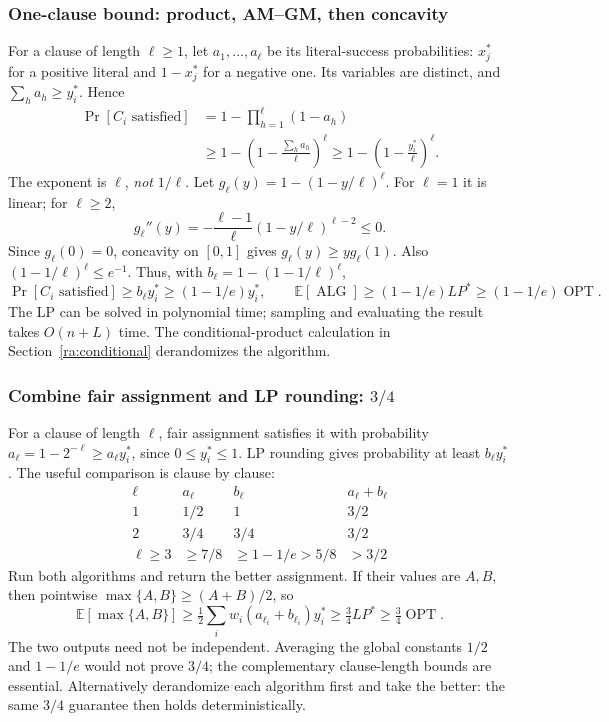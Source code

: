\documentclass[10pt]{article}
\theoremstyle{definition}
\newcommand{\OPT}{\operatorname{OPT}}
\newcommand{\ALG}{\operatorname{ALG}}
\begin{document}
\subsubsection*{One-clause bound: product, AM--GM, then concavity}
For a clause of length $\ell\ge1$, let $a_1,\ldots,a_\ell$ be its
literal-success probabilities: $x_j^*$ for a positive literal and
$1-x_j^*$ for a negative one. Its variables are distinct, and
$\sum_h a_h\ge y_i^*$. Hence
\[
  \begin{aligned}
    \Pr[C_i\text{ satisfied}]
      &=1-\prod_{h=1}^{\ell}(1-a_h)\\
      &\ge1-\left(1-\frac{\sum_h a_h}{\ell}\right)^{\ell}
       \ge1-\left(1-\frac{y_i^*}{\ell}\right)^{\ell}.
  \end{aligned}
\]
The exponent is $\ell$, \emph{not} $1/\ell$.
Let $g_\ell(y)=1-(1-y/\ell)^\ell$. For $\ell=1$ it is linear; for
$\ell\ge2$,
\[
  g_\ell''(y)=-\frac{\ell-1}{\ell}(1-y/\ell)^{\ell-2}\le0.
\]
Since $g_\ell(0)=0$, concavity on $[0,1]$ gives
$g_\ell(y)\ge y g_\ell(1)$. Also
$(1-1/\ell)^\ell\le e^{-1}$. Thus, with
$b_\ell=1-(1-1/\ell)^\ell$,
\[
  \Pr[C_i\text{ satisfied}]
    \ge b_\ell y_i^*\ge(1-1/e)y_i^*,\qquad
  \mathbb E[\ALG]\ge(1-1/e)LP^*\ge(1-1/e)\OPT.
\]
The LP can be solved in polynomial time; sampling and evaluating the result
takes $O(n+L)$ time. The conditional-product calculation in
Section~\ref{ra:conditional} derandomizes the algorithm.

\subsubsection*{Combine fair assignment and LP rounding: $3/4$}
For a clause of length $\ell$, fair assignment satisfies it with probability
$a_\ell=1-2^{-\ell}\ge a_\ell y_i^*$, since $0\le y_i^*\le1$.
LP rounding gives probability at least $b_\ell y_i^*$. The useful comparison
is clause by clause:
\[
  \begin{array}{c|c|c|c}
    \ell&a_\ell&b_\ell&a_\ell+b_\ell\\\hline
    1&1/2&1&3/2\\
    2&3/4&3/4&3/2\\
    \ell\ge3&\ge7/8&\ge1-1/e>5/8&>3/2
  \end{array}
\]
Run both algorithms and return the better assignment. If their values are
$A,B$, then pointwise $\max\{A,B\}\ge(A+B)/2$, so
\[
  \mathbb E[\max\{A,B\}]
    \ge\tfrac12\sum_iw_i(a_{\ell_i}+b_{\ell_i})y_i^*
    \ge\tfrac34LP^*\ge\tfrac34\OPT.
\]
The two outputs need not be independent. Averaging the global constants
$1/2$ and $1-1/e$ would not prove $3/4$; the complementary clause-length
bounds are essential. Alternatively derandomize each algorithm first and
take the better: the same $3/4$ guarantee then holds deterministically.
\end{document}
